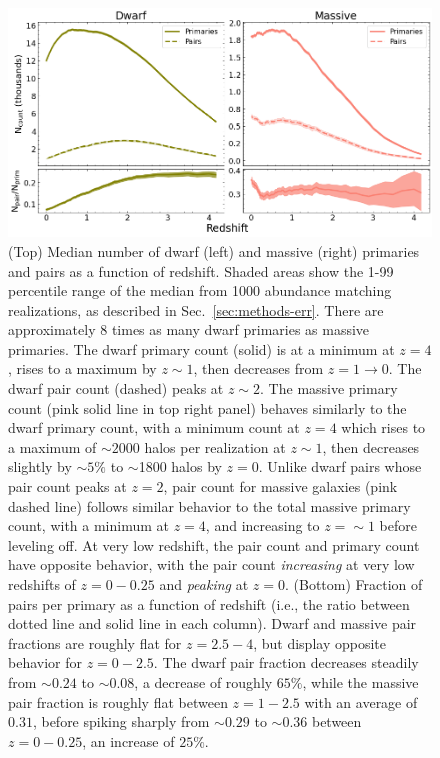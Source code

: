 \documentclass[twocolumn]{aastex631}
\begin{document}
\begin{figure}[htb]
    \centering
    \includegraphics[width=\textwidth]{counts_1000.png}
    \caption{(Top) Median number of dwarf (left) and massive (right) primaries and pairs as a function of redshift.
    Shaded areas show the 1-99 percentile range of the median from 1000 abundance matching realizations, as described in Sec.~\ref{sec:methods-err}.
    There are approximately 8 times as many dwarf primaries as massive primaries. 
    The dwarf primary count (solid) is at a minimum at $z=4$, rises to a maximum by $z\sim1$, then decreases from $z=1\to0$. 
    The dwarf pair count (dashed) peaks at $z\sim2$.
    The massive primary count (pink solid line in top right panel) behaves similarly to the dwarf primary count, with a minimum count at $z=4$ which rises to a maximum of $\sim2000$ halos per realization at $z\sim1$, then decreases slightly by $\sim5\%$ to $\sim$1800 halos by $z=0$. 
    Unlike dwarf pairs whose pair count peaks at $z=2$, pair count for massive galaxies (pink dashed line) follows similar behavior to the total massive primary count, with a minimum at $z=4$, and increasing to $z=\sim 1$ before leveling off. At very low redshift, the pair count and primary count have opposite behavior, with the pair count \textit{increasing} at very low redshifts of $z=0-0.25$ and \textit{peaking} at $z=0$.
    (Bottom) Fraction of pairs per primary as a function of redshift (i.e., the ratio between dotted line and solid line in each column). Dwarf and massive pair fractions are roughly flat for $z=2.5-4$, but display opposite behavior for $z=0-2.5$. The dwarf pair fraction decreases steadily from $\sim0.24$ to $\sim0.08$, a decrease of roughly $65\%$, while the massive pair fraction is roughly flat between $z=1-2.5$ with an average of $0.31$, before spiking sharply from $\sim 0.29$ to $\sim 0.36$ between $z=0-0.25$, an increase of $25\%$.}
    \label{fig:counts}
\end{figure}
\end{document}

